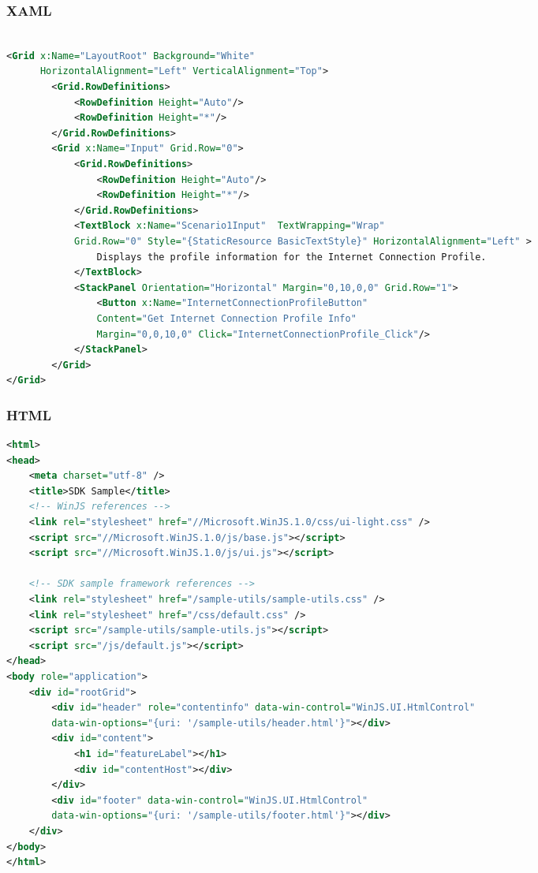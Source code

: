 \begin{frame}[fragile]
\frametitle{XAML}
 \begin{adjustbox}{width=\textwidth}
\begin{lstlisting}[language=XML,basicstyle=\ttfamily]

<Grid x:Name="LayoutRoot" Background="White" 
      HorizontalAlignment="Left" VerticalAlignment="Top"> 
        <Grid.RowDefinitions> 
            <RowDefinition Height="Auto"/> 
            <RowDefinition Height="*"/> 
        </Grid.RowDefinitions> 
        <Grid x:Name="Input" Grid.Row="0"> 
            <Grid.RowDefinitions> 
                <RowDefinition Height="Auto"/> 
                <RowDefinition Height="*"/> 
            </Grid.RowDefinitions> 
            <TextBlock x:Name="Scenario1Input"  TextWrapping="Wrap" 
            Grid.Row="0" Style="{StaticResource BasicTextStyle}" HorizontalAlignment="Left" > 
                Displays the profile information for the Internet Connection Profile. 
            </TextBlock> 
            <StackPanel Orientation="Horizontal" Margin="0,10,0,0" Grid.Row="1"> 
                <Button x:Name="InternetConnectionProfileButton" 
                Content="Get Internet Connection Profile Info" 
                Margin="0,0,10,0" Click="InternetConnectionProfile_Click"/> 
            </StackPanel> 
        </Grid> 
</Grid> 
\end{lstlisting}
\end{adjustbox}
\end{frame}

\begin{frame}[fragile]
\frametitle{HTML}
 \begin{adjustbox}{width=\textwidth}
\begin{lstlisting}[language=XML,basicstyle=\ttfamily]
<html> 
<head> 
    <meta charset="utf-8" /> 
    <title>SDK Sample</title> 
    <!-- WinJS references --> 
    <link rel="stylesheet" href="//Microsoft.WinJS.1.0/css/ui-light.css" /> 
    <script src="//Microsoft.WinJS.1.0/js/base.js"></script> 
    <script src="//Microsoft.WinJS.1.0/js/ui.js"></script> 
 
    <!-- SDK sample framework references --> 
    <link rel="stylesheet" href="/sample-utils/sample-utils.css" /> 
    <link rel="stylesheet" href="/css/default.css" /> 
    <script src="/sample-utils/sample-utils.js"></script> 
    <script src="/js/default.js"></script> 
</head> 
<body role="application"> 
    <div id="rootGrid"> 
        <div id="header" role="contentinfo" data-win-control="WinJS.UI.HtmlControl" 
        data-win-options="{uri: '/sample-utils/header.html'}"></div> 
        <div id="content"> 
            <h1 id="featureLabel"></h1> 
            <div id="contentHost"></div> 
        </div> 
        <div id="footer" data-win-control="WinJS.UI.HtmlControl" 
        data-win-options="{uri: '/sample-utils/footer.html'}"></div> 
    </div> 
</body> 
</html> 
\end{lstlisting}
\end{adjustbox}
\end{frame}


